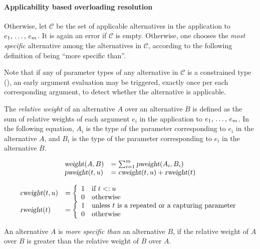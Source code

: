 \paragraph{Applicability based overloading resolution}
Otherwise, let $\mathcal{C}$ be the set of applicable alternatives in the application to $e_1 ,\, \ldots ,\, e_m$. It is again an error if $\mathcal{C}$ is empty. Otherwise, one chooses the {\em most specific} alternative among the alternatives in $\mathcal{C}$, according to the following definition of being  ``more specific than''.

Note that if any of parameter types of any alternative in $\mathcal{C}$ is a constrained type (), an early argument evaluation may be triggered, exactly once per each corresponding argument, to detect whether the alternative is applicable. 

\begin{definition}
The {\em relative weight} of an alternative $A$ over an alternative $B$ is defined as the sum of relative weights of each argument $e_i$ in the application to $e_1 ,\, \ldots ,\, e_m$. In the following equation, $A_i$ is the type of the parameter corresponding to $e_i$ in the alternative $A$, and $B_i$ is the type of the parameter corresponding to $e_i$ in the alternative $B$. 

\[\begin{array}{l l}
\mbox{\sl weight}(A, B) &= \sum_{i=1}^{m} \mbox{\sl pweight}(A_i, B_i) \\
\mbox{\sl pweight}(t, u) &= \mbox{\sl cweight}(t, u) + \mbox{\sl rweight}(t)
\end{array}
\]

\[\begin{array}{l l}
\mbox{\sl cweight}(t, u) &= \left\{ 
  \begin{array}{l l}
    1 & \textrm{if $t <: u$}\\
    0 & \textrm{otherwise}
  \end{array} \right. \\
\mbox{\sl rweight}(t) &= \left\{ 
  \begin{array}{l l}
    1 & \textrm{unless $t$ is a repeated or a capturing parameter}\\
    0 & \textrm{otherwise}
  \end{array} \right.
\end{array}\]
\end{definition}

An alternative $A$ is {\em more specific than} an alternative $B$, if the relative weight of $A$ over $B$ is greater than the relative weight of $B$ over $A$. 

